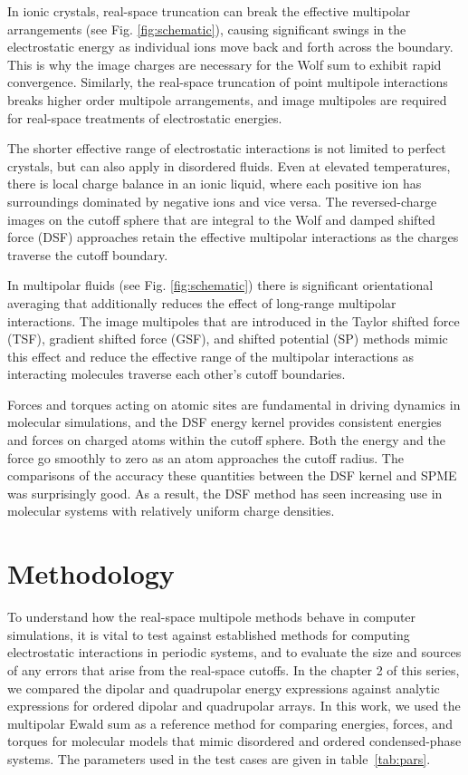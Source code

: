 In ionic crystals, real-space truncation can break the effective
multipolar arrangements (see Fig. \ref{fig:schematic}), causing
significant swings in the electrostatic energy as individual ions move
back and forth across the boundary.  This is why the image charges are
necessary for the Wolf sum to exhibit rapid convergence.  Similarly,
the real-space truncation of point multipole interactions breaks
higher order multipole arrangements, and image multipoles are required
for real-space treatments of electrostatic energies.

The shorter effective range of electrostatic interactions is not
limited to perfect crystals, but can also apply in disordered fluids.
Even at elevated temperatures, there is local charge balance in an
ionic liquid, where each positive ion has surroundings dominated by
negative ions and vice versa.  The reversed-charge images on the
cutoff sphere that are integral to the Wolf and damped shifted force
(DSF) approaches retain the effective multipolar interactions as the
charges traverse the cutoff boundary.

In multipolar fluids (see Fig. \ref{fig:schematic}) there is
significant orientational averaging that additionally reduces the
effect of long-range multipolar interactions.  The image multipoles
that are introduced in the Taylor shifted force (TSF), gradient
shifted force (GSF), and shifted potential (SP) methods mimic this effect and reduce the effective range of the multipolar interactions as
interacting molecules traverse each other's cutoff boundaries.

Forces and torques acting on atomic sites are fundamental in driving
dynamics in molecular simulations, and the DSF energy kernel provides
consistent energies and forces on charged atoms within the cutoff
sphere. Both the energy and the force go smoothly to zero as an atom
approaches the cutoff radius. The comparisons of the accuracy these
quantities between the DSF kernel and SPME was surprisingly
good.\cite{Gezelter06} As a result, the DSF method has seen
increasing use in molecular systems with relatively uniform charge
densities. \cite{English08,Kannam13,Forrest12,Louden13,McCann13,Shi13,Tokumasu13}

\section{Methodology}
To understand how the real-space multipole methods behave in computer
simulations, it is vital to test against established methods for
computing electrostatic interactions in periodic systems, and to
evaluate the size and sources of any errors that arise from the
real-space cutoffs.  In the chapter 2 of this series, we compared
the dipolar and quadrupolar energy expressions against analytic
expressions for ordered dipolar and quadrupolar
arrays.\cite{Sauer,LT,Nagai60,Nagai63} In this work, we
used the multipolar Ewald sum as a reference method for comparing
energies, forces, and torques for molecular models that mimic
disordered and ordered condensed-phase systems.  The parameters used
in the test cases are given in table~\ref{tab:pars}. 

